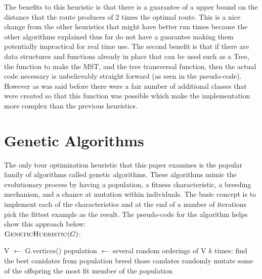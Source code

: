 \documentclass[midd]{thesis}
\newcommand{\tab}{\hspace*{2em}}
\begin{document}
\tab The benefits to this heuristic is that there is a guarantee of a upper bound on the distance that the route produces of 2 times the optimal route. This is a nice change from the other heuristics that might have better run times because the other algorithms explained thus far do not have a guarantee making them potentially impractical for real time use. The second benefit is that if there are data structures and functions already in place that can be used such as a Tree, the function to make the MST, and the tree transversal function, then the actual code necessary is unbelievably straight forward (as seen in the pseudo-code). However as was said before there were a fair number of additional classes that were created so that this function was possible which make the implementation more complex than the previous heuristics.

\section{Genetic Algorithms}
\tab The only tour optimization heuristic that this paper examines is the popular family of algorithms called genetic algorithms. These algorithms mimic the evolutionary process by having a population, a fitness characteristic, a breeding mechanism, and a chance at mutation within individuals. The basic concept is to implement each of the characteristics and at the end of a number of iterations pick the fittest example as the result. The pseudo-code for the algorithm helps show this approach below:\\
$\textnormal{\scshape GeneticHueristic}(G)$:
\begin{codebox}
\li V $\gets$ G.vertices()
\li population $\gets$ several random orderings of V
\li \For $k$ times:
\li find the best canidates from population
\li breed those candates
\li randomly mutate some of the offspring \End
\li \Return the most fit member of the population
\end{codebox}
\end{document}
